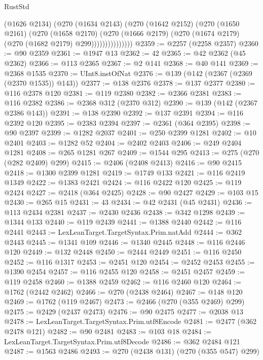 \begin{lexlean}{RustStd}
\begin{coremodule}
                    (@1626 @2134)
                    (@270
                      (@1634 @2143)
                      (@270
                        (@1642 @2152)
                        (@270
                          (@1650 @2161)
                          (@270
                            (@1658 @2170)
                            (@270
                              (@1666 @2179)
                              (@270 (@1674 @2179) (@270 (@1682 @2179) @299)))))))))))))))
@2359 := @2257 (@2258 @2357)
@2360 := @90 @2359
@2361 := @1947 @13
@2362 := 42
@2365 := @42 @2362 (@45 @2362)
@2366 := @113 @2365
@2367 := @2 @141
@2368 := @40 @141
@2369 := @2368 @1535
@2370 := UInt8.instOfNat
@2376 := @139 (@142 (@2367 (@2369 (@2370 @1535)) @143))
@2377 := @138 @2376
@2378 := @137 @2377
@2380 := @116 @2378 @120
@2381 := @119 @2380
@2382 := @2366 @2381
@2383 := @116 @2382
@2386 := @2368 @312 (@2370 @312)
@2390 := @139 (@142 (@2367 @2386 @143))
@2391 := @138 @2390
@2392 := @137 @2391
@2394 := @116 @2392 @120
@2395 := @2383 @2394
@2397 := @2361 (@364 @2395)
@2398 := @90 @2397
@2399 := @1282 @2037
@2401 := @250 @2399 @1281
@2402 := @10 @2401
@2403 := @1282 @52
@2404 := @2402 @2403
@2406 := @249 @2404 @1281
@2408 := @265 @1281 @267
@2409 := @1544 @295
@2413 := @275 (@270 (@282 @2409) @299)
@2415 := @2406 (@2408 @2413)
@2416 := @90 @2415
@2418 := @1300 @2399 @1281
@2419 := @1749 @133
@2421 := @116 @2419 @1349
@2422 := @1383 @2421
@2424 := @116 @2422 @120
@2425 := @119 @2424
@2427 := @2418 (@364 @2425)
@2428 := @90 @2427
@2429 := @103 @15
@2430 := @265 @15
@2431 := 43
@2434 := @42 @2431 (@45 @2431)
@2436 := @113 @2434 @2381
@2437 := @2430 @2436
@2438 := @342 @1298
@2439 := @1344 @133
@2440 := @119 @2439
@2441 := @1388 @2440
@2442 := @116 @2441
@2443 := LexLeanTarget.TargetSyntax.Prim.natAdd
@2444 := @362 @2443
@2445 := @1341 @109
@2446 := @1340 @2445
@2448 := @116 @2446 @120
@2449 := @132 @2448
@2450 := @2444 @2449
@2451 := @116 @2450
@2452 := @116 @1317
@2453 := @2451 @120
@2454 := @2452 @2453
@2455 := @1390 @2454
@2457 := @116 @2455 @120
@2458 := @2451 @2457
@2459 := @119 @2458
@2460 := @1388 @2459
@2462 := @116 @2460 @120
@2464 := @1762 (@2442 @2462)
@2466 := @270 (@2438 @2464)
@2467 := @148 @120
@2469 := @1762 (@119 @2467)
@2473 := @2466 (@270 (@355 @2469) @299)
@2475 := @2429 (@2437 @2473)
@2476 := @90 @2475
@2477 := @2038 @13
@2478 := LexLeanTarget.TargetSyntax.Prim.utf8Encode
@2481 := @2477 (@362 @2478 @121)
@2482 := @90 @2481
@2483 := @103 @18
@2484 := LexLeanTarget.TargetSyntax.Prim.utf8Decode
@2486 := @362 @2484 @121
@2487 := @1563 @2486
@2493 := @270 (@2438 @131) (@270 (@355 @547) @299)

\end{coremodule}
\end{lexlean}
